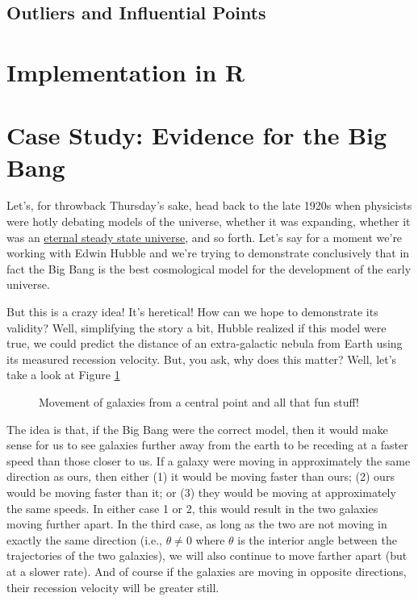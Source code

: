 \subsection{Outliers and Influential Points}

\section{Implementation in R}

\section{Case Study: Evidence for the Big Bang}

Let's, for throwback Thursday's sake, head back to the late 1920s when physicists were hotly debating models of the universe, whether it was expanding, whether it was an \href{http://en.wikipedia.org/wiki/Steady_state_theory}{eternal steady state universe}, and so forth. Let's say for a moment we're working with Edwin Hubble and we're trying to demonstrate conclusively that in fact the Big Bang is the best cosmological model for the development of the early universe.

But this is a crazy idea! It's heretical! How can we hope to demonstrate its validity? Well, simplifying the story a bit, Hubble realized if this model were true, we could predict the distance of an extra-galactic nebula from Earth using its measured recession velocity. But, you ask, why does this matter? Well, let's take a look at Figure \ref{fig:regression06}

\begin{figure}[h]

\label{fig:regression06}
\caption{Movement of galaxies from a central point and all that fun stuff!}
\end{figure}

The idea is that, if the Big Bang were the correct model, then it would make sense for us to see galaxies further away from the earth to be receding at a faster speed than those closer to us. If a galaxy were moving in approximately the same direction as ours, then either (1) it would be moving faster than ours; (2) ours would be moving faster than it; or (3) they would be moving at approximately the same speeds. In either case 1 or 2, this would result in the two galaxies moving further apart. In the third case, as long as the two are not moving in exactly the same direction (i.e., $\theta \neq 0$ where $\theta$ is the interior angle between the trajectories of the two galaxies), we will also continue to move farther apart (but at a slower rate). And of course if the galaxies are moving in opposite directions, their recession velocity will be greater still.

